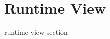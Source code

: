 \documentclass[../../../../dd.tex]{subfiles}
\begin{document}
	\section{Runtime View}

	runtime view section
	
\end{document}
